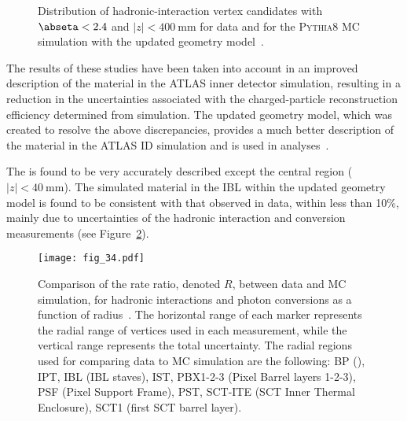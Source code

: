 \documentclass[cernpreprint, atlasdraft=false, UKenglish,british,orcidlogo, texmf, orcidlogo]{atlasdoc}
\begin{document}
\begin{figure}
\begin{center}
\end{center}
\caption{ Distribution of hadronic-interaction vertex candidates with $\abseta<2.4$ and $|z|<\SI{400}{\mm}$ \protect{} for data and \protect{} for the \textsc{Pythia8} MC simulation with the updated geometry model~\cite{PERF-2015-07}. 
}
\label{fig:ID2Dmap}
\end{figure}
 
The results of these studies have been taken into account in an improved description of the material in the ATLAS inner detector simulation, resulting in a reduction in the uncertainties associated with the charged-particle reconstruction efficiency determined from simulation.
The updated geometry model, which was created to resolve the above discrepancies, provides a much better description of the material in the ATLAS \gls{ID} simulation and is used in analyses~\cite{IDTR-2019-05}.
 
 
The \beampipe is found to be very accurately described except the central region ($|z| < \SI{40}{\mm}$).
The simulated material in the \gls{IBL} within the updated geometry model is found to be consistent with that observed in data, within less than 10\%, mainly due to uncertainties of the hadronic interaction and conversion measurements (see Figure~\ref{fig:hadroconv}).
 
\begin{figure}
\begin{center}
\texttt{[image: fig\_34.pdf]}
\end{center}
\caption{Comparison of the rate ratio, denoted $R$, between data and \gls{MC} simulation, for hadronic interactions and photon conversions as a function of radius~\cite{PERF-2015-07}.  The horizontal range of each marker represents the radial range of vertices used in each measurement, while the vertical range represents the total uncertainty.
The radial regions used for comparing data to \gls{MC} simulation are the following: BP (\beampipe), \gls{IPT}, IBL (\gls{IBL} staves), \gls{IST}, PBX1-2-3 (Pixel Barrel layers 1-2-3), PSF (Pixel Support Frame), \gls{PST}, SCT-ITE (SCT Inner Thermal Enclosure), SCT1 (first
\gls{SCT} barrel layer).
}
\label{fig:hadroconv}
\end{figure}
 
\end{document}
